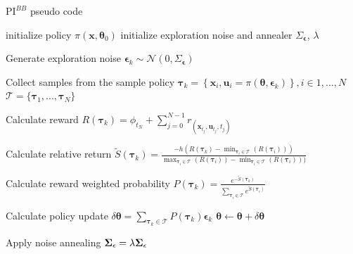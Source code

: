 \documentclass[mscThesis.tex]{subfiles}
\begin{document}
\begin{algorithm}
\caption{$\text{PI}^{BB}$ pseudo code}
\label{alg:PIBB}
\begin{algorithmic}[1]
\State initialize policy $\pi(\bm{x}, \bm{\theta}_0)$
\State initialize exploration noise and annealer $\Sigma_{\bm{\epsilon}}$, $\lambda$



\State Generate exploration noise 
\State $\bm{\epsilon}_k \sim  \mathcal{N} (0, \Sigma_{\bm{\epsilon}})$

\State Collect samples from the sample policy
\State $ \bm{\tau}_k = \left\{\bm{x}_i, \bm{u}_i = \pi (\bm{\theta}, \bm{\epsilon}_k) \right\}, i \in { 1, ... , N } $
\State $ \mathcal{T} = \{ \bm{\tau}_1, ..., \bm{\tau}_N \}$

\State Calculate reward
\State $R(\bm{\tau}_{k}) = \phi_{t_{N}} + \sum_{j=0}^{N-1} r_(\bm{x}_{t_{j}}, \bm{u}_{t_{j}}, t_{j})$

\EndFor

\State Calculate relative return
\State $\tilde{S}(\bm{\tau}_k) = \frac{-h (R(\bm{\tau}_k) - \min_{\bm{\tau}_i \in \mathcal{T}} (R(\bm{\tau}_i)) )}{\max_{\bm{\tau}_i \in \mathcal{T}} (R(\bm{\tau}_i)) - \min_{\bm{\tau}_i \in \mathcal{T}} (R(\bm{\tau}_i)) )}$

\State Calculate reward weighted probability
\State $P(\bm{\tau}_{k}) = \frac{e^{-\tilde{S}(\bm{\tau}_k)}}{\sum_{\bm{\tau}_i \in \mathcal{T}} e^{\tilde{S}(\bm{\tau}_i)}}$

\State Calculate policy update
\State $\delta \bm{\theta} = \sum_{\bm{\tau}_k \in \mathcal{T}} P(\bm{\tau}_k) \bm{\epsilon}_k$
\State $\bm{\theta} \gets \bm{\theta} + \delta \bm{\theta}$

\State Apply noise annealing 
\State $\mathbf{\Sigma}_{\epsilon} = \lambda \mathbf{\Sigma}_{\epsilon}$ 

\EndWhile
\end{algorithmic}
\end{algorithm}

\clearpage

%
%
\end{document}
